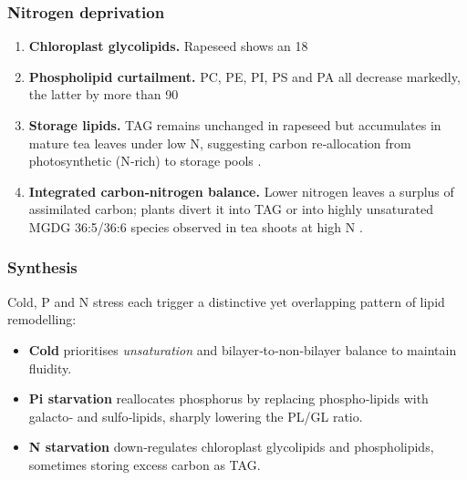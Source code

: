 \documentclass[10pt,letterpaper]{article}
\begin{document}
\subsubsection*{Nitrogen deprivation}
\label{sec:nitrogen}

\begin{enumerate}[label=\textbf{\arabic*.}, leftmargin=1.2em]
  \item \textbf{Chloroplast glycolipids.}  Rapeseed shows an 18 %

  \item \textbf{Phospholipid curtailment.}  PC, PE, PI, PS and PA all decrease markedly, the latter by more than 90 %

  \item \textbf{Storage lipids.}  TAG remains unchanged in rapeseed but accumulates in mature tea leaves under low N, suggesting carbon re‑allocation from photosynthetic (N‑rich) to storage pools \citep[pp.~6--7]{Nitrogen_fertilizer_Ruan}.

  \item \textbf{Integrated carbon‑nitrogen balance.}  Lower nitrogen leaves a surplus of assimilated carbon; plants divert it into TAG or into highly unsaturated MGDG 36:5/36:6 species observed in tea shoots at high N \citep{Nitrogen_fertilizer_Ruan}.
\end{enumerate}

\subsubsection*{Synthesis}

Cold, P and N stress each trigger a distinctive yet overlapping pattern of lipid remodelling:

\begin{itemize}
  \item \textbf{Cold} prioritises \emph{unsaturation} and bilayer‑to‑non‑bilayer balance to maintain fluidity.  
  \item \textbf{Pi starvation} reallocates phosphorus by replacing phospho‑lipids with galacto‑ and sulfo‑lipids, sharply lowering the PL/GL ratio.  
  \item \textbf{N starvation} down‑regulates chloroplast glycolipids and phospholipids, sometimes storing excess carbon as TAG.  
\end{itemize}
\end{document}
